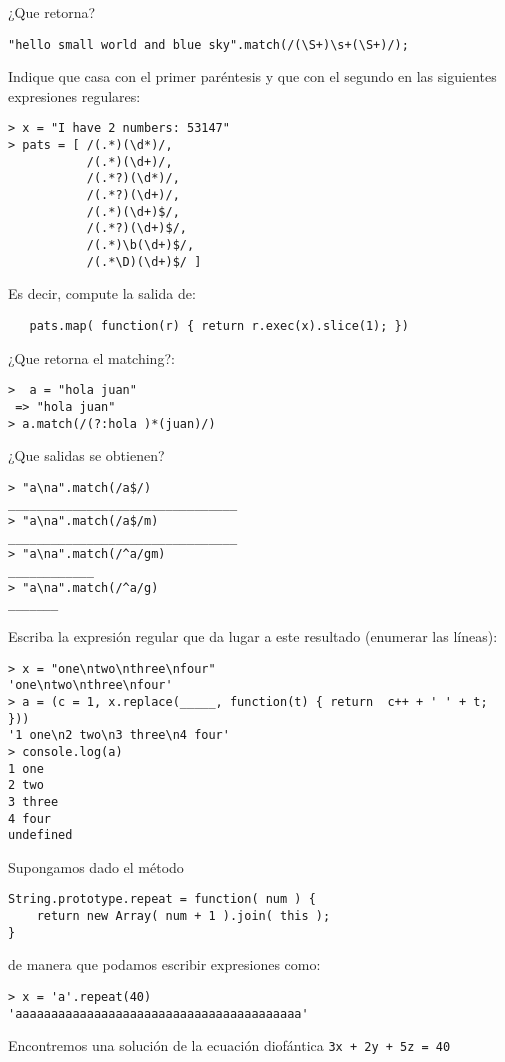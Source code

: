 
\item
¿Que retorna?
\begin{verbatim}
"hello small world and blue sky".match(/(\S+)\s+(\S+)/);
\end{verbatim}

\item
Indique que casa con el primer paréntesis y que con el segundo en las siguientes expresiones regulares:
\begin{verbatim}
> x = "I have 2 numbers: 53147"
> pats = [ /(.*)(\d*)/, 
           /(.*)(\d+)/, 
           /(.*?)(\d*)/, 
           /(.*?)(\d+)/, 
           /(.*)(\d+)$/, 
           /(.*?)(\d+)$/, 
           /(.*)\b(\d+)$/, 
           /(.*\D)(\d+)$/ ]
\end{verbatim}
Es decir, compute la salida de:
\begin{verbatim}
   pats.map( function(r) { return r.exec(x).slice(1); })
\end{verbatim}
\item
¿Que retorna el matching?:
\begin{verbatim}
>  a = "hola juan"
 => "hola juan" 
> a.match(/(?:hola )*(juan)/)
\end{verbatim}
\item ¿Que salidas se obtienen?
\begin{verbatim}
> "a\na".match(/a$/)
________________________________
> "a\na".match(/a$/m)
________________________________
> "a\na".match(/^a/gm)
____________
> "a\na".match(/^a/g)
_______
\end{verbatim}
\item
Escriba  la expresión regular que da lugar a este resultado (enumerar las líneas):
\begin{verbatim}
> x = "one\ntwo\nthree\nfour"
'one\ntwo\nthree\nfour'
> a = (c = 1, x.replace(_____, function(t) { return  c++ + ' ' + t; }))
'1 one\n2 two\n3 three\n4 four'
> console.log(a)
1 one
2 two
3 three
4 four
undefined
\end{verbatim}
\item
Supongamos dado el método
\begin{verbatim}
String.prototype.repeat = function( num ) {
    return new Array( num + 1 ).join( this );
}
\end{verbatim}
de manera que podamos escribir expresiones como:
\begin{verbatim}
> x = 'a'.repeat(40)
'aaaaaaaaaaaaaaaaaaaaaaaaaaaaaaaaaaaaaaaa'
\end{verbatim}
Encontremos una solución de la ecuación diofántica \verb|3x + 2y + 5z = 40|
